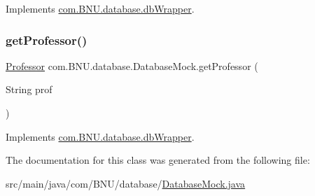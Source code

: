 Implements \mbox{\hyperlink{interfacecom_1_1_b_n_u_1_1database_1_1db_wrapper_a1ed594ea1c8144cbcdab0e5a6a446722}{com.\+B\+N\+U.\+database.\+db\+Wrapper}}.

\mbox{\label{classcom_1_1_b_n_u_1_1database_1_1_database_mock_a50b0d167f6a5be892b288dd8b34b241a}} 
\subsubsection{\texorpdfstring{get\+Professor()}{getProfessor()}}
{\footnotesize\ttfamily \mbox{\hyperlink{classcom_1_1_b_n_u_1_1pages_1_1teachers_by_class_1_1_professor}{Professor}} com.\+B\+N\+U.\+database.\+Database\+Mock.\+get\+Professor (\begin{DoxyParamCaption}\item[{String}]{prof }\end{DoxyParamCaption})}



Implements \mbox{\hyperlink{interfacecom_1_1_b_n_u_1_1database_1_1db_wrapper_a59b21a9c8d9f8ad2c2d723bfca5952af}{com.\+B\+N\+U.\+database.\+db\+Wrapper}}.



The documentation for this class was generated from the following file\+:\begin{DoxyCompactItemize}
\item 
src/main/java/com/\+B\+N\+U/database/\mbox{\hyperlink{_database_mock_8java}{Database\+Mock.\+java}}\end{DoxyCompactItemize}
